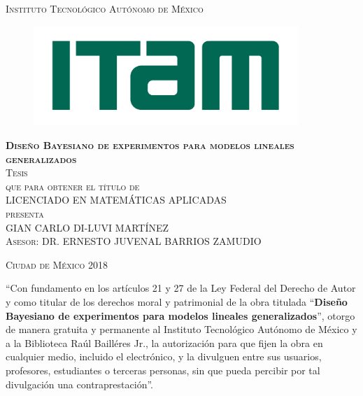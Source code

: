 \documentclass[11pt]{book}
\begin{document}
\begin{titlepage}
\begin{center}

\textsc{\Large Instituto Tecnológico Autónomo de México}\\[4em]

\begin{figure}[h]
\begin{center}
\includegraphics[width=10cm]{logo-ITAM-tesis.png}
\end{center}
\end{figure}

\vspace{2em}

\textsc{\huge \textbf{Diseño Bayesiano de experimentos para modelos lineales generalizados}}\\[2em]

\textsc{\large Tesis}\\[1em]

\textsc{que para obtener el título de}\\[1em]

\textsc{LICENCIADO EN MATEMÁTICAS APLICADAS}\\[1em]

\textsc{presenta}\\[1em]

\textsc{\Large GIAN CARLO DI-LUVI MARTÍNEZ}\\[1em]

\textsc{\large Asesor: DR. ERNESTO JUVENAL BARRIOS ZAMUDIO}

\end{center}

\vspace*{\fill}
\textsc{Ciudad de México \hspace*{\fill} 2018}

\end{titlepage}



\thispagestyle{empty}
\vspace*{\fill}
\begingroup
``Con fundamento en los artículos 21 y 27 de la Ley Federal del Derecho de Autor y como titular de los derechos moral y patrimonial de la obra titulada ``\textbf{Diseño Bayesiano de experimentos para modelos lineales generalizados}'', otorgo de manera gratuita y permanente al Instituto Tecnológico Autónomo de México y a la Biblioteca Raúl Bailléres Jr., la autorización para que fijen la obra en cualquier medio, incluido el electrónico, y la divulguen entre sus usuarios, profesores, estudiantes o terceras personas, sin que pueda percibir por tal divulgación una contraprestación''.
\end{document}

